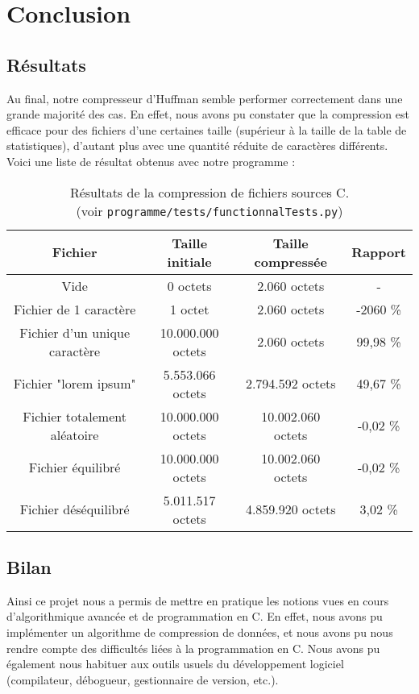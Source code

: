\chapter{Conclusion}

\section{Résultats}

Au final, notre compresseur d'Huffman semble performer correctement dans une grande majorité des cas.
En effet, nous avons pu constater que la compression est efficace pour des fichiers d'une certaines taille (supérieur à la taille de la table de statistiques), d'autant plus avec une quantité réduite de caractères différents.
Voici une liste de résultat obtenus avec notre programme :

\begin{table}[h]
\centering
\begin{tabular}{|c|c|c|c|}
\hline
Fichier & Taille initiale & Taille compressée & Rapport \\ \hline
Vide & 0 octets & 2.060 octets & - \\
Fichier de 1 caractère & 1 octet & 2.060 octets & -2060 \% \\ 
Fichier d'un unique caractère & 10.000.000 octets & 2.060 octets & 99,98 \% \\ 
Fichier "lorem ipsum" & 5.553.066 octets & 2.794.592 octets & 49,67 \% \\ 
Fichier totalement aléatoire & 10.000.000 octets & 10.002.060 octets & -0,02 \% \\ 
Fichier équilibré & 10.000.000 octets & 10.002.060 octets & -0,02 \% \\
Fichier déséquilibré & 5.011.517 octets & 4.859.920 octets & 3,02 \% \\
\hline
\end{tabular}
\caption{Résultats de la compression de fichiers sources C.\\
(voir \texttt{programme/tests/functionnalTests.py})}
\end{table}

\section{Bilan}

Ainsi ce projet nous a permis de mettre en pratique les notions vues en cours d'algorithmique avancée et de programmation en C.
En effet, nous avons pu implémenter un algorithme de compression de données, et nous avons pu nous rendre compte des difficultés liées à la programmation en C.
Nous avons pu également nous habituer aux outils usuels du développement logiciel (compilateur, débogueur, gestionnaire de version, etc.).
